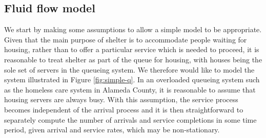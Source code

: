 \documentclass[12pt,a4paper]{article}
\begin{document}
\subsection{Fluid flow model} \label{fluid-model}
%
We start by making some assumptions to allow a simple model to be appropriate. Given that the main purpose of shelter is to accommodate people waiting for housing, rather than to offer a particular service which is needed to proceed, it is reasonable to treat shelter as part of the queue for housing, with houses being the sole set of servers in the queueing system. We therefore would like to model the system illustrated in Figure \ref{fig:simple-q}. In an overloaded queueing system such as the homeless care system in Alameda County, it is reasonable to assume that housing servers are always busy. With this assumption, the service process becomes independent of the arrival process and it is then straightforward to separately compute the number of arrivals and service completions in some time period, given arrival and service rates, which may be non-stationary.
\end{document}
